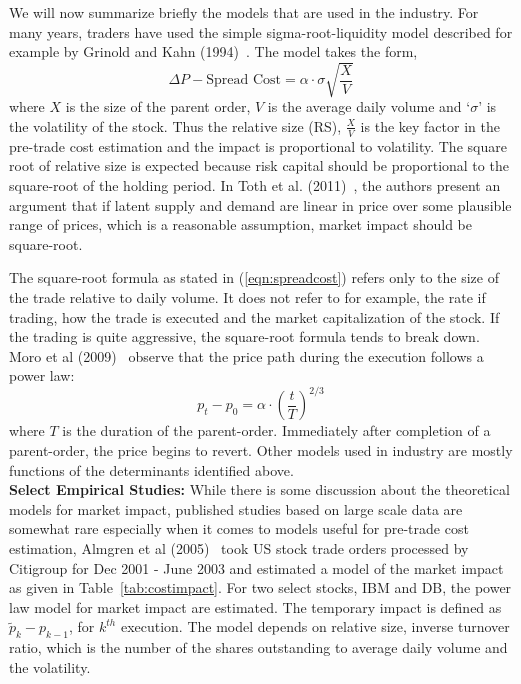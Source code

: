 We will now summarize briefly the models that are used in the industry. For many years, traders have used the simple sigma-root-liquidity model described for example by Grinold and Kahn (1994)~\cite{grin2000}. The model takes the form,
	\begin{equation}\label{eqn:spreadcost}
	\Delta P - \text{Spread Cost} = \alpha\cdot\sigma\sqrt{\frac{X}{V}}
	\end{equation}
where $X$ is the size of the parent order, $V$ is the average daily volume and `$\sigma$' is the volatility of the stock. Thus the relative size (RS), $\frac{X}{V}$ is the key factor in the pre-trade cost estimation and the impact is proportional to volatility. The square root of relative size is expected because risk capital should be proportional to the square-root of the holding period. In Toth et al. (2011)~\cite{toth2011anomalous}, the authors present an argument that if latent supply and demand are linear in price over some plausible range of prices, which is a reasonable assumption, market impact should be square-root.


The square-root formula as stated in (\ref{eqn:spreadcost}) refers only to the size of the trade relative to daily volume. It does not refer to for example, the rate if trading, how the trade is executed and the market capitalization of the stock. If the trading is quite aggressive, the square-root formula tends to break down. Moro et al (2009)~\cite{moro2009market} observe that the price path during the execution follows a power law:
	\begin{equation}\label{eqn:ptalpha}
	p_t - p_0 = \alpha\cdot({\frac{t}{T}})^{2/3}
	\end{equation}
where $T$ is the duration of the parent-order. Immediately after completion of a parent-order, the price begins to revert. Other models used in industry are mostly functions of the determinants identified above. \\


\noindent\textbf{Select Empirical Studies:} While there is some discussion about the theoretical models for market impact, published studies based on large scale data are somewhat rare especially when it comes to models useful for pre-trade cost estimation, Almgren et al (2005)~\cite{athl} took US stock trade orders processed by Citigroup for Dec 2001 - June 2003 and estimated a model of the market impact as given in Table~\ref{tab:costimpact}. For two select stocks, IBM and DB, the power law model for market impact are estimated. The temporary impact is defined as $\widetilde{p}_k - p_{k-1}$, for $k^{th}$ execution. The model depends on relative size, inverse turnover ratio, which is the number of the shares outstanding to average daily volume and the volatility.


